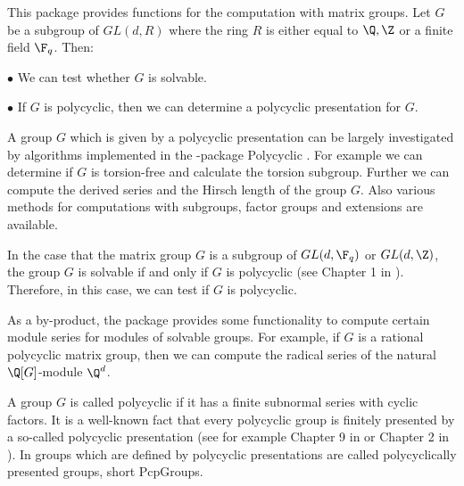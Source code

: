 


This package provides functions for the computation with matrix
groups. Let $G$ be a subgroup of $GL(d,R)$ where the ring $R$ is
either equal to $\Q,\Z$ or a finite field $\F_q$.
Then: 
 \smallskip
{\parindent=25pt
\item{$\bullet$} 
    We can test whether $G$ is solvable.
 \smallskip
\item{$\bullet$}
    If $G$ is polycyclic, then we can determine a polycyclic
    presentation for $G$. 
    \smallskip
}
\smallskip

A group $G$ which is given by a polycyclic presentation can be largely
investigated by algorithms implemented in the {\GAP}-package
Polycyclic \cite{polycyclic}. For example 
we can determine if $G$ is torsion-free
and calculate the torsion subgroup. Further we can compute the derived
series and the Hirsch length of the group $G$. Also various methods for
computations with subgroups, factor groups and extensions are
available.

In the case that the matrix group 
$G$ is a subgroup of $GL(d,\F_q)$ or $GL(d,\Z)$, the
group $G$ is solvable if and only if $G$ is polycyclic (see Chapter 1
in \cite{Segal}). 
Therefore, in this case, we can test if $G$ is polycyclic. 

As a by-product, the {\Polenta} package 
provides some functionality to compute certain module series for
modules of solvable groups. For example, if
$G$ is a rational polycyclic matrix group, then we can compute the 
radical series of the natural
$\Q[G]$-module $\Q^d$.  


A group $G$ is called polycyclic if it has a finite subnormal
series with cyclic 
factors. It is a well-known fact that every polycyclic group is
finitely presented by a so-called polycyclic presentation (see
for example Chapter 9 in \cite{Sims} or Chapter 2 in \cite{polycyclic} ). 
In {\GAP} groups which are defined by polycyclic
 presentations are called
polycyclically presented groups, short PcpGroups.
 
